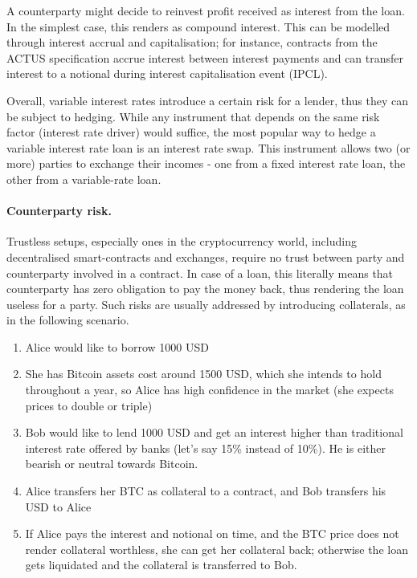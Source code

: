 \documentclass[runningheads]{llncs}
\begin{document}
A counterparty might decide to reinvest profit received as interest
from the %
loan. In the simplest case, this renders as compound
interest. This can be modelled through interest accrual and capitalisation;
for instance, contracts from the ACTUS specification accrue interest
between interest payments and can transfer interest to a notional
during interest capitalisation event (IPCL).

Overall, variable interest rates introduce a certain risk for a lender,
thus they can be %
subject to hedging. While any instrument that depends
on the same risk factor (interest rate driver) would suffice, the
most popular way to hedge a variable interest rate loan is an interest
rate swap. This instrument allows two (or more) parties to exchange
their incomes - one from a fixed interest rate loan, the other from a variable-rate loan.

\paragraph*{Counterparty risk.}

Trustless setups, especially ones in the cryptocurrency world, including 
decentralised smart-contracts and exchanges, require no trust between
party and counterparty involved in a contract. In case of a loan,
this literally means that counterparty has zero obligation to pay
the money back, thus rendering the loan useless for a party. Such
risks are usually addressed by introducing collaterals, as in the following scenario. 
\begin{enumerate}
\item Alice would like to borrow 1000 USD 
\item She has Bitcoin assets cost around 1500 USD, which she intends to
hold throughout a year, so Alice has high confidence in the market
(she expects prices to double or triple) 
\item Bob would like to lend 1000 USD and get an interest higher than traditional
interest rate offered by banks (let's say 15\% instead of 10\%). He
is either bearish or neutral towards Bitcoin. 
\item Alice transfers her BTC as collateral to a contract, and Bob transfers
his USD to Alice 
\item If Alice pays the interest and notional on time, and the BTC price does not
render collateral worthless, she can get her collateral back; otherwise
the loan gets liquidated and the collateral is transferred to Bob. 
\end{enumerate}
\end{document}
